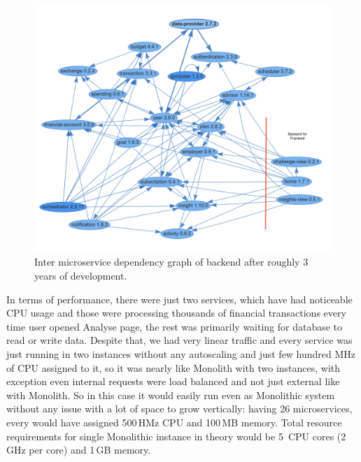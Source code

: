 \begin{figure}
    \centering
    \includegraphics[width=\textwidth]{images/microservices-current-commented.png}
    \caption{Inter microservice dependency graph of backend after roughly 3 years of development. \label{img:microservices-current-commented}}
\end{figure}

In terms of performance, there were just two services, which have had noticeable CPU usage and those were processing thousands of financial transactions every time user opened Analyse page, the rest was primarily waiting for database to read or write data. Despite that, we had very linear traffic and every service was just running in two instances without any autoscaling and just few hundred MHz of CPU assigned to it, so it was nearly like Monolith with two instances, with exception even internal requests were load balanced and not just external like with Monolith. So in this case it would easily run even as Monolithic system without any issue with a lot of space to grow vertically: having 26 microservices, every would have assigned 500\,HMz CPU and 100\,MB memory. Total resource requirements for single Monolithic instance in theory would be 5~CPU cores (2\,GHz per core) and 1\,GB memory.

